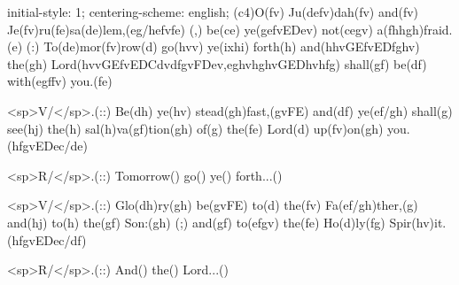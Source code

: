 initial-style: 1;
centering-scheme: english;
(c4)O(fv) Ju(defv)dah(fv) and(fv) Je(fv)ru(fe)sa(de)lem,(eg/hefvfe) (,) be(ce) ye(gefvEDev) not(cegv) a(fhhgh)fraid.(e) (:) To(de)mor(fv)row(d) go(hvv) ye(ixhi) forth(h) and(hhvGEfvEDfghv) the(gh) Lord(hvvGEfvEDCdvdfgvFDev,eghvhghvGEDhvhfg) shall(gf) be(df) with(egffv) you.(fe)

<sp>V/</sp>.(::) Be(dh) ye(hv) stead(gh)fast,(gvFE) and(df) ye(ef/gh) shall(g) see(hj) the(h) sal(h)va(gf)tion(gh) of(g) the(fe) Lord(d) up(fv)on(gh) you.(hfgvEDec/de)

<sp>R/</sp>.(::) Tomorrow() go() ye() forth...()

<sp>V/</sp>.(::) Glo(dh)ry(gh) be(gvFE) to(d) the(fv) Fa(ef/gh)ther,(g) and(hj) to(h) the(gf) Son:(gh) (;) and(gf) to(efgv) the(fe) Ho(d)ly(fg) Spir(hv)it.(hfgvEDec/df)

<sp>R/</sp>.(::) And() the() Lord...()